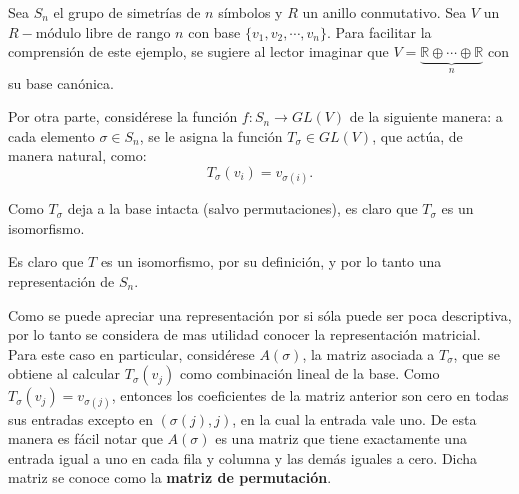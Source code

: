 \begin{ejemplo}
Sea $S_n$ el grupo de simetrías de $n$ símbolos y $R$ un anillo conmutativo. Sea $V$ un $R-\mbox{módulo}$ libre de rango $n$ con base $\{v_1, v_2, \cdots, v_n\}$. Para facilitar la comprensión de este ejemplo, se sugiere al lector imaginar que $V = \underset{n}{\underbrace{\mathds{R} \oplus \cdots \oplus \mathds{R}}}$ con su base canónica. 

Por otra parte, considérese la función $f \colon S_n \to GL(V)$ de la siguiente manera: a cada elemento $\sigma 
\in S_n$, se le asigna la función $T_{\sigma} \in GL(V)$, que actúa, de manera natural, como:
\begin{equation*}
T_{\sigma}(v_i) = v_{\sigma(i)}.
\end{equation*}

Como $T_{\sigma}$ deja a la base intacta (salvo permutaciones), es claro que $T_\sigma$ es un isomorfismo. 

 
Es claro que $T$ es un isomorfismo, por su definición, y por lo tanto una representación de $S_n$.

Como se puede apreciar una representación por si sóla puede ser poca descriptiva, por lo tanto se considera de mas utilidad conocer la representación matricial. Para este caso en particular, considérese $A(\sigma)$, la matriz asociada a $T_{\sigma}$, que se obtiene al calcular $T_{\sigma}(v_j)$ como combinación lineal de la base. Como $T_{\sigma} (v_j) = v_{\sigma(j)}$, entonces los coeficientes de la matriz anterior son cero en todas sus entradas excepto en $(\sigma(j),j)$, en la cual la entrada vale uno. De esta manera es fácil notar que $A(\sigma)$ es una matriz que tiene exactamente una entrada igual a uno en cada fila y columna y las demás iguales a cero. Dicha matriz se conoce como la \textbf{matriz de permutación}.\newline

\end{ejemplo}



